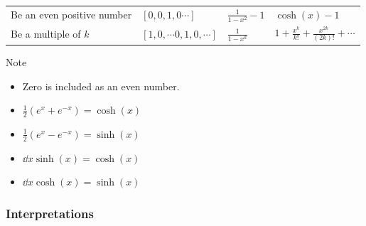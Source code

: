 \begin{longtable}[]{@{}llll@{}}
\begin{minipage}[t]{0.22\columnwidth}
Be an even positive number\strut
\end{minipage} & \begin{minipage}[t]{0.22\columnwidth}\raggedright
\([0,0,1,0\cdots]\)\strut
\end{minipage} & \begin{minipage}[t]{0.22\columnwidth}\raggedright
\(\frac 1 {1-x^2} - 1\)\strut
\end{minipage} & \begin{minipage}[t]{0.22\columnwidth}\raggedright
\(\cosh(x) - 1\)\strut
\end{minipage}\tabularnewline
\begin{minipage}[t]{0.22\columnwidth}\raggedright
Be a multiple of \(k\)\strut
\end{minipage} & \begin{minipage}[t]{0.22\columnwidth}\raggedright
\([1,0,\cdots 0,1,0,\cdots]\)\strut
\end{minipage} & \begin{minipage}[t]{0.22\columnwidth}\raggedright
\(\frac 1 {1-x^k}\)\strut
\end{minipage} & \begin{minipage}[t]{0.22\columnwidth}\raggedright
\(1 + \frac{x^k}{k!} + \frac{x^{2k}}{(2k)!} + \cdots\)\strut
\end{minipage}\tabularnewline
\bottomrule
\end{longtable}

Note

\begin{itemize}
\tightlist
\item
  Zero is included as an even number.
\item
  \(\frac{1}{2}(e^x + e^{-x}) = \cosh(x)\)
\item
  \(\frac{1}{2}(e^x - e^{-x}) = \sinh(x)\)
\item
  \(\dd{}{x} \sinh(x) = \cosh(x)\)
\item
  \(\dd{}{x} \cosh(x) = \sinh(x)\)
\end{itemize}

\hypertarget{interpretations}{%
\subsubsection{Interpretations}\label{interpretations}}

